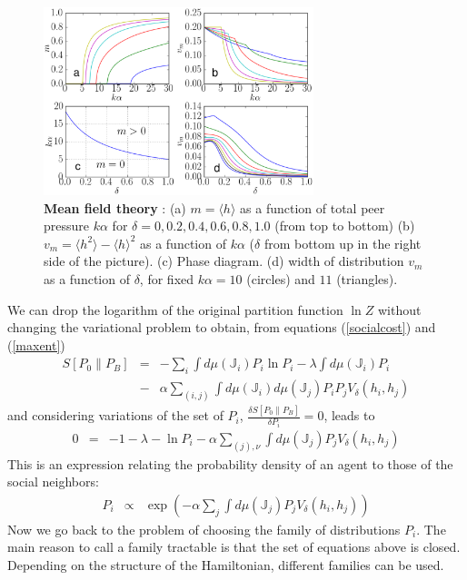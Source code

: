 \documentclass[twocolumn,showpacs]{revtex4-1}
\begin{document}
\begin{widetext}
\begin{figure}[!htb]
\centering
\includegraphics[width=0.7\textwidth]{fig6_mfpanel.eps}
\centering \caption{{\bf Mean field theory} : (a) $ m= \langle h \rangle$  as a function of total peer pressure $k\alpha$ for $\delta=0,0.2,0.4,0.6,0.8,1.0$ (from top to bottom) (b) $v_m=\langle h^2
  \rangle - \langle h \rangle^2 $ as a function of $k\alpha$ ($\delta$ from bottom up in the right side of the picture). (c) Phase diagram. (d)
width of distribution $v_m$ as a function of $\delta$, for fixed $k\alpha=10$ (circles) and $11$ (triangles).}
\label{fig:mag1ex}
\end{figure}
\end{widetext}

We can drop the logarithm of the original partition function $\ln Z$ without 
changing  the
variational problem to obtain, from equations (\ref{socialcost}) and
(\ref{maxent}) 
\begin{eqnarray}
S\left[P_0 \|P_B \right]&=&-\sum_i \int  d\mu(\mathbb{J}_i)
P_i
\ln P_i - \lambda \int   d\mu(\mathbb{J}_i) P_i 
\nonumber \\
 &-&
\alpha
\sum_{(i,j)} \int   d\mu(\mathbb{J}_i)d\mu(\mathbb{J}_j)
 P_i P_j
 V_\delta(h_i,h_j)   \nonumber
\end{eqnarray}
and considering variations of the  set of $P_i$,
$
\frac{\delta S\left[P_0 \|P_B \right] }{\delta  P_i}=0
$,  leads to
\begin{eqnarray}
0&=&-1 -\lambda- \ln P_i -\alpha
\sum_{(j), \nu} \int   d\mu(\mathbb{J}_j) P_j
 V_\delta(h_i,h_j)   \nonumber 
\end{eqnarray}
This is an expression relating the probability density of an agent to those
of the social neighbors:
\begin{eqnarray}
P_i &\propto & \exp \left( -
\alpha
 \sum_{j} \int   d\mu(\mathbb{J}_j) 
P_j
V_\delta(h_i,h_j) 
\right) 
\end{eqnarray}
Now we go back to the problem of choosing the family of distributions
$P_i$. The main reason to call a family tractable is that the set
of equations above is closed.  
Depending on the structure of the Hamiltonian, different families can
be used.
\end{document}
